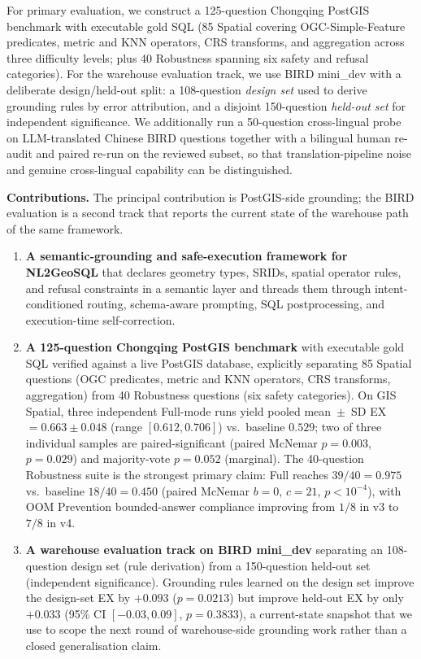 \documentclass[11pt]{article}
\begin{document}
For primary evaluation, we construct a 125-question Chongqing PostGIS benchmark with executable gold SQL (85 Spatial covering OGC-Simple-Feature predicates, metric and KNN operators, CRS transforms, and aggregation across three difficulty levels; plus 40 Robustness spanning six safety and refusal categories). For the warehouse evaluation track, we use BIRD mini\_dev with a deliberate design/held-out split: a 108-question \emph{design set} used to derive grounding rules by error attribution, and a disjoint 150-question \emph{held-out set} for independent significance. We additionally run a 50-question cross-lingual probe on LLM-translated Chinese BIRD questions together with a bilingual human re-audit and paired re-run on the reviewed subset, so that translation-pipeline noise and genuine cross-lingual capability can be distinguished.

\medskip
\noindent\textbf{Contributions.} The principal contribution is PostGIS-side grounding; the BIRD evaluation is a second track that reports the current state of the warehouse path of the same framework.
\begin{enumerate}[leftmargin=*]
  \item \textbf{A semantic-grounding and safe-execution framework for NL2GeoSQL} that declares geometry types, SRIDs, spatial operator rules, and refusal constraints in a semantic layer and threads them through intent-conditioned routing, schema-aware prompting, SQL postprocessing, and execution-time self-correction.
  \item \textbf{A 125-question Chongqing PostGIS benchmark} with executable gold SQL verified against a live PostGIS database, explicitly separating 85 Spatial questions (OGC predicates, metric and KNN operators, CRS transforms, aggregation) from 40 Robustness questions (six safety categories). On GIS Spatial, three independent Full-mode runs yield pooled mean~$\pm$~SD EX$=0.663 \pm 0.048$ (range $[0.612, 0.706]$) vs.\ baseline $0.529$; two of three individual samples are paired-significant (paired McNemar $p=0.003$, $p=0.029$) and majority-vote $p=0.052$ (marginal). The 40-question Robustness suite is the strongest primary claim: Full reaches $39/40 = 0.975$ vs.\ baseline $18/40 = 0.450$ (paired McNemar $b=0$, $c=21$, $p<10^{-4}$), with OOM Prevention bounded-answer compliance improving from $1/8$ in v3 to $7/8$ in v4.
  \item \textbf{A warehouse evaluation track on BIRD mini\_dev} separating an 108-question design set (rule derivation) from a 150-question held-out set (independent significance). Grounding rules learned on the design set improve the design-set EX by $+0.093$ ($p=0.0213$) but improve held-out EX by only $+0.033$ (95\% CI $[-0.03, 0.09]$, $p=0.3833$), a current-state snapshot that we use to scope the next round of warehouse-side grounding work rather than a closed generalisation claim.
\end{enumerate}
\end{document}
